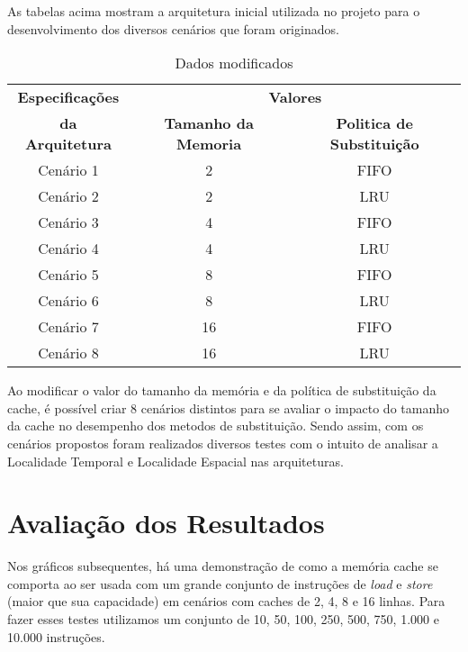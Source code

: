 \documentclass[conference]{IEEEtran}
\begin{document}
As tabelas acima mostram a arquitetura inicial utilizada no projeto para o desenvolvimento dos diversos 
cenários que foram originados.    

\begin{table}[H]
  \caption{Dados modificados}
  \centering
      \begin{tabular}{|c|c|c|}
          \hline
          \textbf{Especificações} & \multicolumn{2}{|c|}{\textbf{Valores}} \\
          \cline{2-3} 
          \textbf{da Arquitetura} & \textbf{Tamanho da Memoria} & \textbf{Politica de Substituição} \\
          \hline
          Cenário 1 & 2 & FIFO \\
          \hline
          Cenário 2 & 2 & LRU \\
          \hline
          Cenário 3 & 4 & FIFO\\
          \hline
          Cenário 4 & 4 & LRU\\
          \hline
          Cenário 5 & 8 & FIFO\\
          \hline
          Cenário 6 & 8 & LRU\\
          \hline
          Cenário 7 & 16 & FIFO\\
          \hline
          Cenário 8 & 16 & LRU\\
          \hline
      \end{tabular}
      \label{tab3}
\end{table}

Ao modificar o valor do tamanho da memória e da política de substituição da cache, é possível criar 8 cenários distintos
para se avaliar o impacto do tamanho da cache no desempenho dos metodos de substituição. Sendo assim, com os cenários propostos
foram realizados diversos testes com o intuito de analisar a Localidade Temporal e Localidade Espacial nas arquiteturas.

\section{Avaliação dos Resultados}


Nos gráficos subsequentes, há uma demonstração de como a memória cache se comporta ao ser usada com
um grande conjunto de instruções de \emph{load} e \emph{store} (maior que sua capacidade) em cenários com caches de 2, 4, 8 e 16 linhas.
Para fazer esses testes utilizamos um conjunto de 10, 50, 100, 250, 500, 750, 1.000 e 10.000 
instruções.
\end{document}
